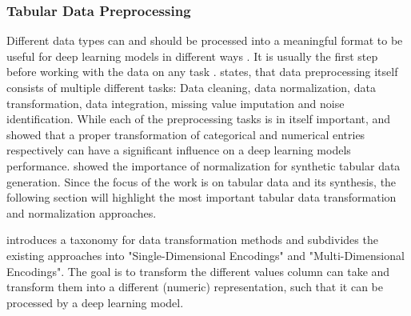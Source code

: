 \subsubsection{Tabular Data Preprocessing}
\label{sec:preprocessing}

Different data types can and should be processed into a meaningful format to be useful for deep learning \glspl{model} in different ways \cite{fan2020RelationalDataSynthesisa, lederrey2022DATGANIntegratingExperta}.
It is usually the first step before working with the data on any task \cite{izonin2022TwoStepDataNormalization}.
\cite{garcia2016BigDataPreprocessing} states, that data preprocessing itself consists of multiple different tasks: Data cleaning, data normalization, data transformation, data integration, missing value imputation and noise identification.
While each of the preprocessing tasks is in itself important, 
\cite{fitkov-norris2012EvaluatingImpactCategorical} and \cite{gorishniy2022EmbeddingsNumericalFeatures} showed that a proper transformation of categorical and numerical entries respectively can have a significant influence on a deep learning \glspl{model} performance.
\cite{xu2019ModelingTabularData} showed the importance of normalization for synthetic tabular data generation.
Since the focus of the work is on tabular data and its synthesis, the following section will highlight the most important tabular data transformation and normalization approaches.

\label{sec:dataTransformation}

\cite{borisov2022DeepNeuralNetworks} introduces a taxonomy for data transformation methods and subdivides the existing approaches into "Single-Dimensional Encodings" and "Multi-Dimensional Encodings".
The goal is to transform the different values column can take and transform them into a different (numeric) representation, such that it can be processed by a deep learning \gls{model}.

